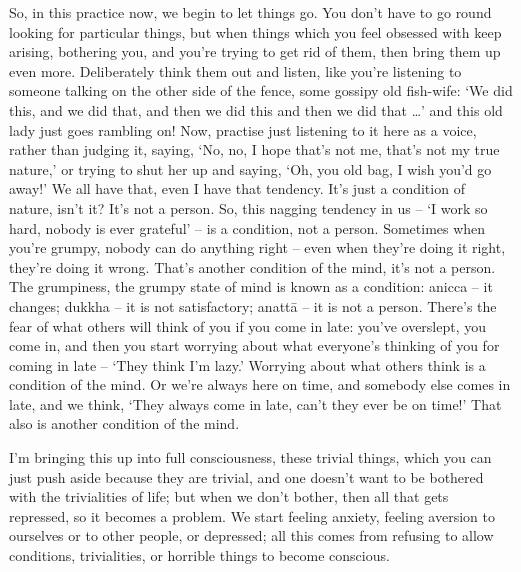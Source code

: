 So, in this practice now, we begin to let things go. You don't have to go round looking for particular things, but when things which you feel obsessed with keep arising, bothering you, and you're trying to get rid of them, then bring them up even more. Deliberately think them out and listen, like you're listening to someone talking on the other side of the fence, some gossipy old fish-wife: `We did this, and we did that, and then we did this and then we did that \ldots{}' and this old lady just goes rambling on! Now, practise just listening to it here as a voice, rather than judging it, saying, `No, no, I hope that's not me, that's not my true nature,' or trying to shut her up and saying, `Oh, you old bag, I wish you'd go away!' We all have that, even I have that tendency. It's just a condition of nature, isn't it? It's not a person. So, this nagging tendency in us -- `I work so hard, nobody is ever grateful' -- is a condition, not a person. Sometimes when you're grumpy, nobody can do anything right -- even when they're doing it right, they're doing it wrong. That's another condition of the mind, it's not a person. The grumpiness, the grumpy state of mind is known as a condition: anicca -- it changes; dukkha -- it is not satisfactory; anattā -- it is not a person. There's the fear of what others will think of you if you come in late: you've overslept, you come in, and then you start worrying about what everyone's thinking of you for coming in late -- `They think I'm lazy.' Worrying about what others think is a condition of the mind. Or we're always here on time, and somebody else comes in late, and we think, `They always come in late, can't they ever be on time!' That also is another condition of the mind.

I'm bringing this up into full consciousness, these trivial things, which you can just push aside because they are trivial, and one doesn't want to be bothered with the trivialities of life; but when we don't bother, then all that gets repressed, so it becomes a problem. We start feeling anxiety, feeling aversion to ourselves or to other people, or depressed; all this comes from refusing to allow conditions, trivialities, or horrible things to become conscious.

